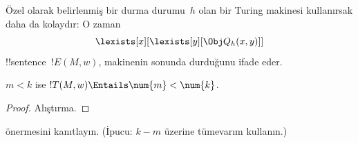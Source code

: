 \documentclass[../../../include/open-logic-section]{subfiles}
\begin{document}
Özel olarak belirlenmiş bir durma durumu~$h$ olan bir Turing makinesi
kullanırsak daha da kolaydır: O zaman
\[
\lexists[x][\lexists[y][\Obj Q_h(x, y)]]
\]
!!{sentence}~$!E(M,w)$, makinenin sonunda durduğunu ifade eder.

\begin{prop}
$m < k$ ise $!T(M, w) \Entails \num{m} < \num{k}$.
\end{prop}

\begin{proof}
Alıştırma.
\end{proof}

\begin{prob}
 önermesini kanıtlayın.
(İpucu: $k-m$ üzerine tümevarım kullanın.)
\end{prob}
\end{document}
